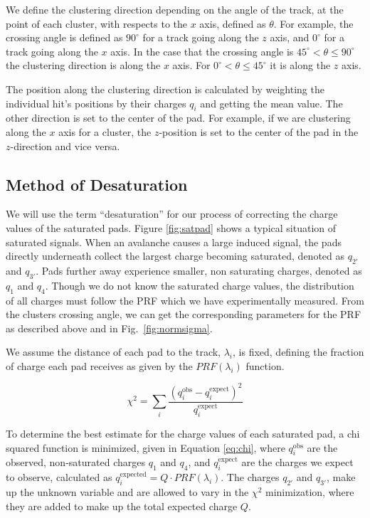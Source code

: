 We define the clustering direction depending on the angle of the track, at the point of each cluster, with respects to the $x$ axis, defined as $\theta$. For example, the crossing angle is defined as $90^{\circ}$ for a track going along the $z$ axis, and $0^{\circ}$ for a track going along the $x$ axis. In the case that the crossing angle is $45^{\circ} < \theta \leq 90^{\circ} $ the clustering direction is along the $x$ axis. For $0^{\circ} < \theta \leq 45^{\circ}$ it is along the $z$ axis. 

 The position along the clustering direction is calculated by weighting the individual hit's positions by their charges $q_i$ and getting the mean value. The other direction is set to the center of the pad. For example, if we are clustering along the $x$ axis for a cluster, the $z$-position is set to the center of the pad in the $z$-direction and vice versa. 
 


\subsection{Method of Desaturation}
We will use the term ``desaturation'' for our process of correcting the charge values of the saturated pads. Figure \ref{fig:satpad} shows a typical situation of saturated signals. When an avalanche causes a large induced signal, the pads directly underneath collect the largest charge becoming saturated, denoted as $q_{2'}$ and $q_{3'}$. Pads further away experience smaller, non saturating charges, denoted as $q_{1}$ and $q_{4}$. Though we do not know the saturated charge values, the distribution of all charges must follow the PRF which we have experimentally measured. From the clusters crossing angle, we can get the corresponding parameters for the PRF as described above and in Fig.~\ref{fig:normsigma}.

We assume the distance of each pad to the track, $\lambda_i$, is fixed, defining the fraction of charge each pad receives as given by the $PRF(\lambda_i)$ function. 


\begin{equation}\label{eq:chi}
\chi^2 = \sum_i \frac{(q_i^{\mathrm{obs}} - q_i^{\mathrm{expect}})^2}{q_i^{\mathrm{expect}}}
\end{equation}

To determine the best estimate for the charge values of each saturated pad, a chi squared function is minimized, given in  Equation \ref{eq:chi}, where $q_i^{\mathrm{obs}}$ are the observed, non-saturated charges $q_{1}$ and $q_{4}$, and $q_i^{\mathrm{expect}}$ are the charges we expect to observe, calculated as $q_i^{\mathrm{expected}} = Q\cdot PRF(\lambda_i)$. The charges $q_{2'}$ and $q_{3'}$, make up the unknown variable and are allowed to vary in the $\chi^2$ minimization, where they are added to make up the total expected charge $Q$.


